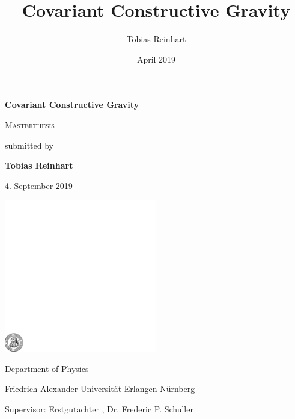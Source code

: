 \documentclass[a4paper,12pt, DIV=14, BCOR=5mm, twoside, headsepline, numbers=noenddot]{scrbook}
\title{Covariant Constructive Gravity}
\author{Tobias Reinhart }
\date{April 2019}
\begin{document}
 
\begin{titlepage}
	\centering

	{\Huge\bfseries Covariant Constructive Gravity\par}
	\vspace{2cm}
	
	{\scshape\Large Masterthesis \par}
	\vspace{1cm}
	{ submitted by \par}
	
	
	
	{\bfseries Tobias Reinhart\par}
		{ 4. September 2019\par}
	\vspace{2cm}
	
	\includegraphics[width=0.5\textwidth]{fau-siegel.pdf}\par
	\vspace{1cm}Department of Physics\par
	Friedrich-Alexander-Universität Erlangen-Nürnberg\par
	Supervisor: Erstgutachter , Dr. Frederic P. Schuller
	
	\vfill





\end{titlepage}
\end{document}
